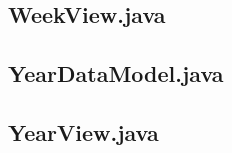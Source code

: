 \documentclass{article}
\begin{document}


\subsection{WeekView.java}



\subsection{YearDataModel.java}



\subsection{YearView.java}


\end{document}
